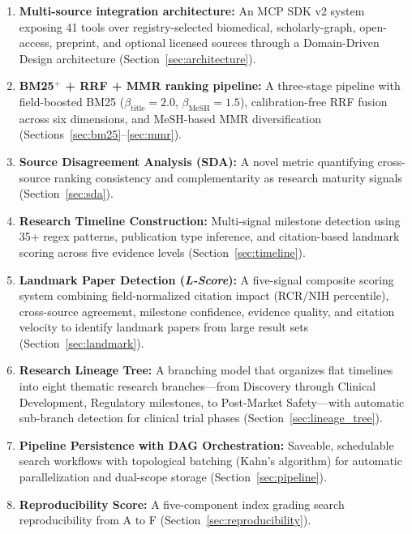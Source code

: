 \documentclass[11pt,a4paper]{article}
\newcommand{\lscore}{\textit{L-Score}}
\begin{document}
\begin{enumerate}
    \item \textbf{Multi-source integration architecture:} An MCP SDK v2 system exposing 41 tools over registry-selected biomedical, scholarly-graph, open-access, preprint, and optional licensed sources through a Domain-Driven Design architecture (Section~\ref{sec:architecture}).

    \item \textbf{BM25$^{+}$ + RRF + MMR ranking pipeline:} A three-stage pipeline with field-boosted BM25 ($\beta_{\text{title}} = 2.0$, $\beta_{\text{MeSH}} = 1.5$), calibration-free RRF fusion across six dimensions, and MeSH-based MMR diversification (Sections~\ref{sec:bm25}--\ref{sec:mmr}).

    \item \textbf{Source Disagreement Analysis (SDA):} A novel metric quantifying cross-source ranking consistency and complementarity as research maturity signals (Section~\ref{sec:sda}).

    \item \textbf{Research Timeline Construction:} Multi-signal milestone detection using 35+ regex patterns, publication type inference, and citation-based landmark scoring across five evidence levels (Section~\ref{sec:timeline}).

    \item \textbf{Landmark Paper Detection (\lscore{}):} A five-signal composite scoring system combining field-normalized citation impact (RCR/NIH percentile), cross-source agreement, milestone confidence, evidence quality, and citation velocity to identify landmark papers from large result sets (Section~\ref{sec:landmark}).

    \item \textbf{Research Lineage Tree:} A branching model that organizes flat timelines into eight thematic research branches---from Discovery through Clinical Development, Regulatory milestones, to Post-Market Safety---with automatic sub-branch detection for clinical trial phases (Section~\ref{sec:lineage_tree}).

    \item \textbf{Pipeline Persistence with DAG Orchestration:} Saveable, schedulable search workflows with topological batching (Kahn's algorithm) for automatic parallelization and dual-scope storage (Section~\ref{sec:pipeline}).

    \item \textbf{Reproducibility Score:} A five-component index grading search reproducibility from A to F (Section~\ref{sec:reproducibility}).
\end{enumerate}
\end{document}
